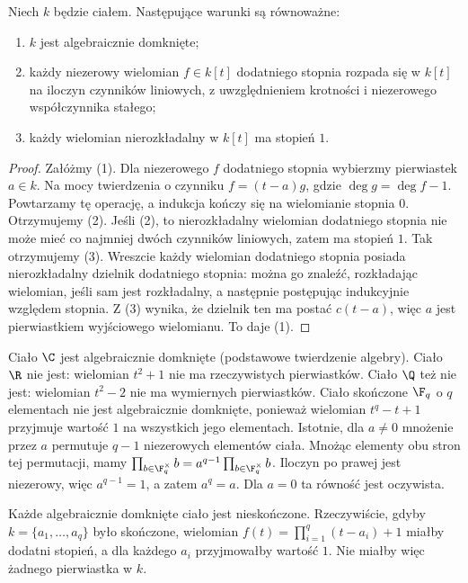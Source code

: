 \begin{stwierdzenie}
Niech $k$ będzie ciałem. Następujące warunki są równoważne:
\begin{enumerate}[label=\arabic*)]
\item $k$ jest algebraicznie domknięte;
\item każdy niezerowy wielomian $f\in k[t]$ dodatniego stopnia
rozpada się w $k[t]$ na iloczyn czynników liniowych, z uwzględnieniem
krotności i niezerowego współczynnika stałego;
\item każdy wielomian nierozkładalny w $k[t]$ ma stopień $1$.
\end{enumerate}
\end{stwierdzenie}
\begin{proof}
Załóżmy (1). Dla niezerowego $f$ dodatniego stopnia wybierzmy
pierwiastek $a\in k$. Na mocy twierdzenia o czynniku
$f=(t-a)g$, gdzie $\deg g=\deg f-1$. Powtarzamy tę operację,
a indukcja kończy się na wielomianie stopnia $0$. Otrzymujemy (2).
Jeśli (2), to nierozkładalny wielomian dodatniego stopnia nie może
mieć co najmniej dwóch czynników liniowych, zatem ma stopień $1$.
Tak otrzymujemy (3). Wreszcie każdy wielomian dodatniego stopnia
posiada nierozkładalny dzielnik dodatniego stopnia:
można go znaleźć, rozkładając wielomian, jeśli sam jest rozkładalny,
a następnie postępując indukcyjnie względem stopnia.
Z (3) wynika, że dzielnik ten ma postać $c(t-a)$,
więc $a$ jest pierwiastkiem wyjściowego wielomianu. To daje (1).
\end{proof}

\begin{przyklad}
Ciało $\C$ jest algebraicznie domknięte (podstawowe twierdzenie algebry).
Ciało $\R$ nie jest: wielomian $t^2+1$ nie ma rzeczywistych pierwiastków.
Ciało $\Q$ też nie jest: wielomian $t^2-2$ nie ma wymiernych
pierwiastków. Ciało skończone $\F_q$ o $q$ elementach nie jest algebraicznie
domknięte, ponieważ wielomian $t^q-t+1$ przyjmuje wartość $1$
na wszystkich jego elementach. Istotnie, dla $a\ne0$
mnożenie przez $a$ permutuje $q-1$ niezerowych elementów ciała.
Mnożąc elementy obu stron tej permutacji, mamy
$\prod_{b\in\F_q^\times}b
=a^{q-1}\prod_{b\in\F_q^\times}b$.
Iloczyn po prawej jest niezerowy, więc $a^{q-1}=1$,
a zatem $a^q=a$. Dla $a=0$ ta równość jest oczywista.
\end{przyklad}

\begin{uwaga}
Każde algebraicznie domknięte ciało jest nieskończone.
Rzeczywiście, gdyby $k=\{a_1,\dots,a_q\}$ było skończone,
wielomian $f(t)=\prod_{i=1}^q(t-a_i)+1$ miałby dodatni stopień,
a dla każdego $a_i$ przyjmowałby wartość $1$.
Nie miałby więc żadnego pierwiastka w $k$.
\end{uwaga}

